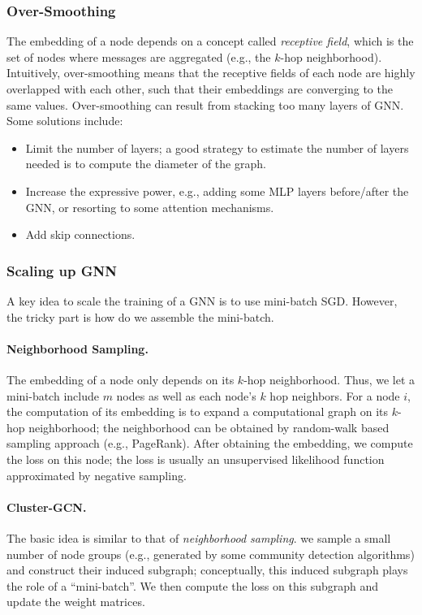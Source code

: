         \subsubsection{Over-Smoothing}
        The embedding of a node depends on a concept called \emph{receptive field}, which is the set of nodes where messages are aggregated (e.g., the $k$-hop neighborhood).
        Intuitively, over-smoothing means that the receptive fields of each node are highly overlapped with each other, such that their embeddings are converging to the same values.
        Over-smoothing can result from stacking too many layers of GNN.
        Some solutions include:
            \begin{itemize}
                \item Limit the number of layers; a good strategy to estimate the number of layers needed is to compute the diameter of the graph.
                \item Increase the expressive power, e.g., adding some MLP layers before/after the GNN, or resorting to some attention mechanisms.
                \item Add skip connections.
            \end{itemize}
        
        \subsubsection{Scaling up GNN}
            A key idea to scale the training of a GNN is to use mini-batch SGD.
            However, the tricky part is how do we assemble the mini-batch.
            
                \paragraph{Neighborhood Sampling.} The embedding of a node only depends on its $k$-hop neighborhood.
                Thus, we let a mini-batch include $m$ nodes as well as each node's $k$ hop neighbors.
                For a node $i$, the computation of its embedding is to expand a computational graph on its $k$-hop neighborhood; the neighborhood can be obtained by random-walk based sampling approach (e.g., PageRank).
                After obtaining the embedding, we  compute the loss on this node; the loss is usually an unsupervised likelihood function approximated by negative sampling.
                \paragraph{Cluster-GCN.} The basic idea is similar to that of \emph{neighborhood sampling}.
                we sample a small number of node groups (e.g., generated by some community detection algorithms) and construct their induced subgraph; conceptually, this induced subgraph plays the role of a ``mini-batch''.
                We then compute the loss on this  subgraph and update the weight matrices. 

